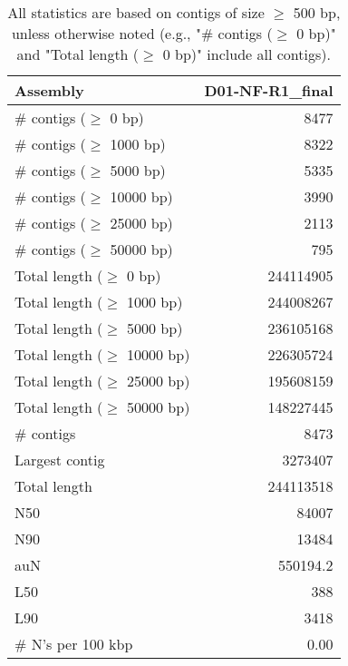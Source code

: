 \documentclass[12pt,a4paper]{article}
\begin{document}
\begin{table}[ht]
\begin{center}
\caption{All statistics are based on contigs of size $\geq$ 500 bp, unless otherwise noted (e.g., "\# contigs ($\geq$ 0 bp)" and "Total length ($\geq$ 0 bp)" include all contigs).}
\begin{tabular}{|l*{1}{|r}|}
\hline
Assembly & D01-NF-R1\_final \\ \hline
\# contigs ($\geq$ 0 bp) & 8477 \\ \hline
\# contigs ($\geq$ 1000 bp) & 8322 \\ \hline
\# contigs ($\geq$ 5000 bp) & 5335 \\ \hline
\# contigs ($\geq$ 10000 bp) & 3990 \\ \hline
\# contigs ($\geq$ 25000 bp) & 2113 \\ \hline
\# contigs ($\geq$ 50000 bp) & 795 \\ \hline
Total length ($\geq$ 0 bp) & 244114905 \\ \hline
Total length ($\geq$ 1000 bp) & 244008267 \\ \hline
Total length ($\geq$ 5000 bp) & 236105168 \\ \hline
Total length ($\geq$ 10000 bp) & 226305724 \\ \hline
Total length ($\geq$ 25000 bp) & 195608159 \\ \hline
Total length ($\geq$ 50000 bp) & 148227445 \\ \hline
\# contigs & 8473 \\ \hline
Largest contig & 3273407 \\ \hline
Total length & 244113518 \\ \hline
N50 & 84007 \\ \hline
N90 & 13484 \\ \hline
auN & 550194.2 \\ \hline
L50 & 388 \\ \hline
L90 & 3418 \\ \hline
\# N's per 100 kbp & 0.00 \\ \hline
\end{tabular}
\end{center}
\end{table}
\end{document}
